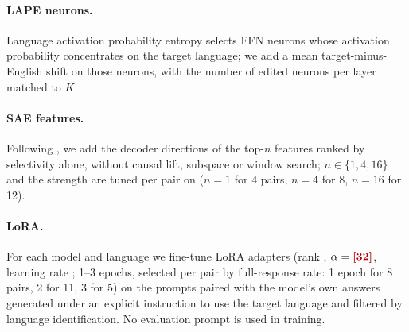 \paragraph{LAPE neurons.}
Language activation probability entropy \citep{tang-etal-2024-language} selects FFN neurons whose activation probability concentrates on the target language; we add a mean target-minus-English shift on those neurons, with the number of edited neurons per layer matched to $K$.

\paragraph{SAE features.}
Following \citet{chou2025causallanguagecontrolmultilingual}, we add the decoder directions of the top-$n$ features ranked by selectivity alone, without causal lift, subspace or window search; $n\in\{1,4,16\}$ and the strength are tuned per pair on \Ddev ($n{=}1$ for 4 pairs, $n{=}4$ for 8, $n{=}16$ for 12).

\paragraph{LoRA.}
For each model and language we fine-tune LoRA adapters \citep{hu2022lora} (rank , $\alpha=\res{32}$, learning rate ; 1--3 epochs, selected per pair by \Ddev full-response rate: 1 epoch for 8 pairs, 2 for 11, 3 for 5) on the \Ddisc \nocue prompts paired with the model's own answers generated under an explicit instruction to use the target language and filtered by language identification. No evaluation prompt is used in training.

